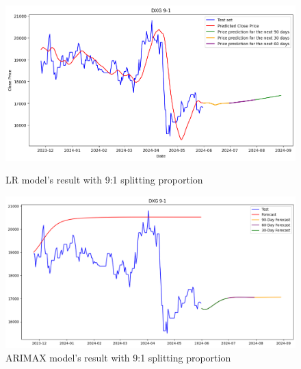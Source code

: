 \documentclass{ieeeojies}
\begin{document}
\begin{figure}[H]
  \centering
  \begin{minipage}{0.23\textwidth}
  \centering
  \includegraphics[width=1\textwidth]{bibliography/Figure/LR_DXG(9-1).png}
  \caption{LR model's result with 9:1 splitting proportion}
  \label{fig:1}
  \end{minipage}
  \hfill
  \begin{minipage}{0.23\textwidth}
  \centering
  \includegraphics[width=1\textwidth]{bibliography/Figure/ARIMAX_DXG(9-1).png}
  \caption{ARIMAX model's result with 9:1 splitting proportion}
  \label{fig:2}
  \end{minipage}
\end{figure}
\end{document}
